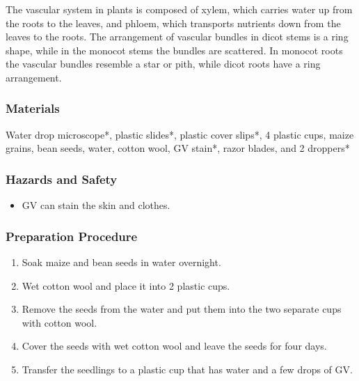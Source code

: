 The vascular system in plants is composed of xylem, which carries water up from the roots to the leaves, and phloem, which transports nutrients down from the leaves to the roots. The arrangement of vascular bundles in dicot stems is a ring shape, while in the monocot stems the bundles are scattered. In monocot roots the vascular bundles resemble a star or pith, while dicot roots have a ring arrangement.

\subsubsection*{Materials}
Water drop microscope*, plastic slides*, plastic cover slips*, 4 plastic cups, maize grains, bean seeds, water, cotton wool, GV stain*, razor blades, and 2 droppers*

\subsubsection*{Hazards and Safety}
\begin{itemize}
\item{GV can stain the skin and clothes.}
\end{itemize}

\subsubsection*{Preparation Procedure}
\begin{enumerate}
\item{Soak maize and bean seeds in water overnight.}
\item{Wet cotton wool and place it into 2 plastic cups.}
\item{Remove the seeds from the water and put them into the two separate cups with cotton wool.}
\item{Cover the seeds with wet cotton wool and leave the seeds for four days.}
\item{Transfer the seedlings to a plastic cup that has water and a few drops of GV.}
\end{enumerate}

